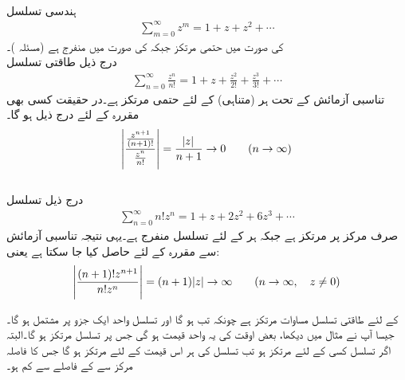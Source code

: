 \quad {}\\
ہندسی تسلسل
\begin{align*}
\sum\limits_{m=0}^{\infty} z^m=1+z+z^2+\cdots
\end{align*}
 کی صورت میں حتمی مرتکز جبکہ  کی صورت میں منفرج  ہے (مسئلہ )۔
\quad {}\\
درج ذیل طاقتی تسلسل
\begin{align*}
\sum\limits_{n=0}^{\infty} \frac{z^n}{n!}=1+z+\frac{z^2}{2!}+\frac{z^3}{3!}+\cdots
\end{align*}
تناسبی آزمائش کے تحت ہر (متناہی)  کے لئے حتمی مرتکز ہے۔در حقیقت کسی بھی مقررہ  کے لئے درج ذیل ہو گا۔
\begin{align*}
\abs{\frac{\tfrac{z^{n+1}}{(n+1)!}}{\tfrac{z^n}{n!}}}=\frac{\abs{z}}{n+1}\to 0 \quad \quad (n\to \infty)
\end{align*}
\quad {}\\
درج ذیل تسلسل
\begin{align*}
\sum\limits_{n=0}^{\infty} n! z^n=1+z+2z^2+6z^3+\cdots
\end{align*}
صرف مرکز  پر مرتکز ہے جبکہ ہر  کے لئے  تسلسل منفرج ہے۔یہی نتیجہ تناسبی آزمائش سے مقررہ  کے لئے حاصل کیا جا سکتا ہے یعنی:
\begin{align*}
\abs{\frac{(n+1)!z^{n+1}}{n!z^n}}=(n+1)\abs{z}\to \infty \quad \quad (n\to \infty,\quad z\ne 0)
\end{align*}

 کے لئے طاقتی تسلسل مساوات   مرتکز ہے چونکہ تب  ہو گا اور تسلسل واحد ایک جزو  پر مشتمل ہو گا۔ جیسا آپ نے مثال  میں دیکھا، بعض اوقت  کی یہ واحد قیمت ہو گی جس پر تسلسل مرتکز ہو گا۔البتہ اگر تسلسل  کسی  کے لئے مرتکز ہو تب تسلسل  کی ہر اس قیمت کے لئے مرتکز ہو گا  جس کا فاصلہ مرکز سے   کے فاصلے سے کم ہو۔

